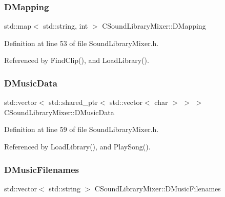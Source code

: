 \subsubsection{\texorpdfstring{D\+Mapping}{DMapping}}
{\footnotesize\ttfamily std\+::map$<$ std\+::string, int $>$ C\+Sound\+Library\+Mixer\+::\+D\+Mapping\hspace{0.3cm}{\ttfamily [protected]}}



Definition at line 53 of file Sound\+Library\+Mixer.\+h.



Referenced by Find\+Clip(), and Load\+Library().

\hypertarget{classCSoundLibraryMixer_a494744db8ea800dd1443418711183846}{}\label{classCSoundLibraryMixer_a494744db8ea800dd1443418711183846} 
\subsubsection{\texorpdfstring{D\+Music\+Data}{DMusicData}}
{\footnotesize\ttfamily std\+::vector$<$ std\+::shared\+\_\+ptr$<$ std\+::vector$<$ char $>$ $>$ $>$ C\+Sound\+Library\+Mixer\+::\+D\+Music\+Data\hspace{0.3cm}{\ttfamily [protected]}}



Definition at line 59 of file Sound\+Library\+Mixer.\+h.



Referenced by Load\+Library(), and Play\+Song().

\hypertarget{classCSoundLibraryMixer_a105a9c5d911492518ac706039bf1de16}{}\label{classCSoundLibraryMixer_a105a9c5d911492518ac706039bf1de16} 
\subsubsection{\texorpdfstring{D\+Music\+Filenames}{DMusicFilenames}}
{\footnotesize\ttfamily std\+::vector$<$ std\+::string $>$ C\+Sound\+Library\+Mixer\+::\+D\+Music\+Filenames\hspace{0.3cm}{\ttfamily [protected]}}



